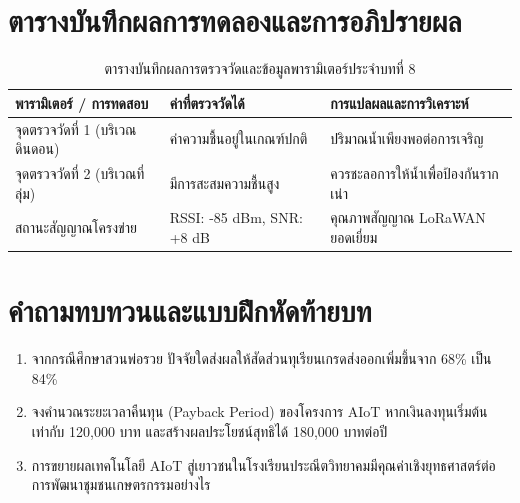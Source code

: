 \section{ตารางบันทึกผลการทดลองและการอภิปรายผล}
\begin{table}[H]
\centering\small
\caption{ตารางบันทึกผลการตรวจวัดและข้อมูลพารามิเตอร์ประจำบทที่ 8}
\label{tab:ch08_datasheet}
\begin{tabularx}{\textwidth}{p{} p{} X}
\toprule
\textbf{พารามิเตอร์ / การทดสอบ} & \textbf{ค่าที่ตรวจวัดได้} & \textbf{การแปลผลและการวิเคราะห์} \\
\midrule
จุดตรวจวัดที่ 1 (บริเวณดินดอน) & ค่าความชื้นอยู่ในเกณฑ์ปกติ & ปริมาณน้ำเพียงพอต่อการเจริญ \\
จุดตรวจวัดที่ 2 (บริเวณที่ลุ่ม) & มีการสะสมความชื้นสูง & ควรชะลอการให้น้ำเพื่อป้องกันรากเน่า \\
สถานะสัญญาณโครงข่าย & RSSI: -85 dBm, SNR: +8 dB & คุณภาพสัญญาณ LoRaWAN ยอดเยี่ยม \\
\bottomrule
\end{tabularx}
\end{table}

\section{คำถามทบทวนและแบบฝึกหัดท้ายบท}
\begin{enumerate}
    \item จากกรณีศึกษาสวนพ่อรวย ปัจจัยใดส่งผลให้สัดส่วนทุเรียนเกรดส่งออกเพิ่มขึ้นจาก 68\% เป็น 84\%
    \item จงคำนวณระยะเวลาคืนทุน (Payback Period) ของโครงการ AIoT หากเงินลงทุนเริ่มต้นเท่ากับ 120,000 บาท และสร้างผลประโยชน์สุทธิได้ 180,000 บาทต่อปี
    \item การขยายผลเทคโนโลยี AIoT สู่เยาวชนในโรงเรียนประณีตวิทยาคมมีคุณค่าเชิงยุทธศาสตร์ต่อการพัฒนาชุมชนเกษตรกรรมอย่างไร
\end{enumerate}
